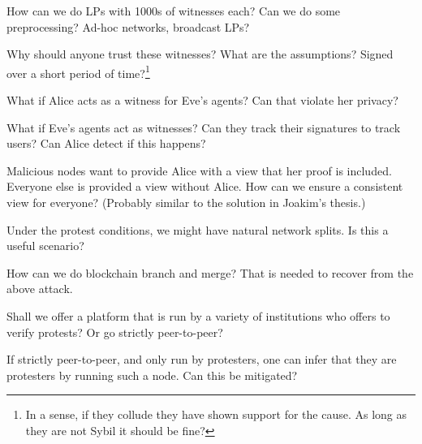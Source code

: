 \begin{frame}
\begin{question}
  How can we do \acp{LP} with 1000s of witnesses each?
  Can we do some preprocessing?
  Ad-hoc networks, broadcast \acp{LP}?
\end{question}
\end{frame}

\begin{frame}
\begin{question}
  Why should anyone trust these witnesses?
  What are the assumptions?
  Signed over a short period of time?\footnote{%
    In a sense, if they collude they have shown support for the cause.
    As long as they are not Sybil it should be fine?
  }
\end{question}

\pause{}

\begin{question}
  What if Alice acts as a witness for Eve's agents?
  Can that violate her privacy?
\end{question}

\pause{}

\begin{question}
  What if Eve's agents act as witnesses?
  Can they track their signatures to track users?
  Can Alice detect if this happens?
\end{question}
\end{frame}

\begin{frame}
  \begin{question}
    Malicious nodes want to provide Alice with a view that her proof is 
    included.
    Everyone else is provided a view without Alice.
    How can we ensure a consistent view for everyone?
    (Probably similar to the solution in Joakim's thesis.)
  \end{question}

  \begin{question}
    Under the protest conditions, we might have natural network splits.
    Is this a useful scenario?
  \end{question}

  \begin{question}
    How can we do blockchain branch and merge?
    That is needed to recover from the above attack.
  \end{question}
\end{frame}

\begin{frame}
  \begin{question}
    Shall we offer a platform that is run by a variety of institutions who 
    offers to verify protests?
    Or go strictly peer-to-peer?
  \end{question}
  \begin{question}
    If strictly peer-to-peer, and only run by protesters, one can infer that 
    they are protesters by running such a node.
    Can this be mitigated?
  \end{question}
\end{frame}

